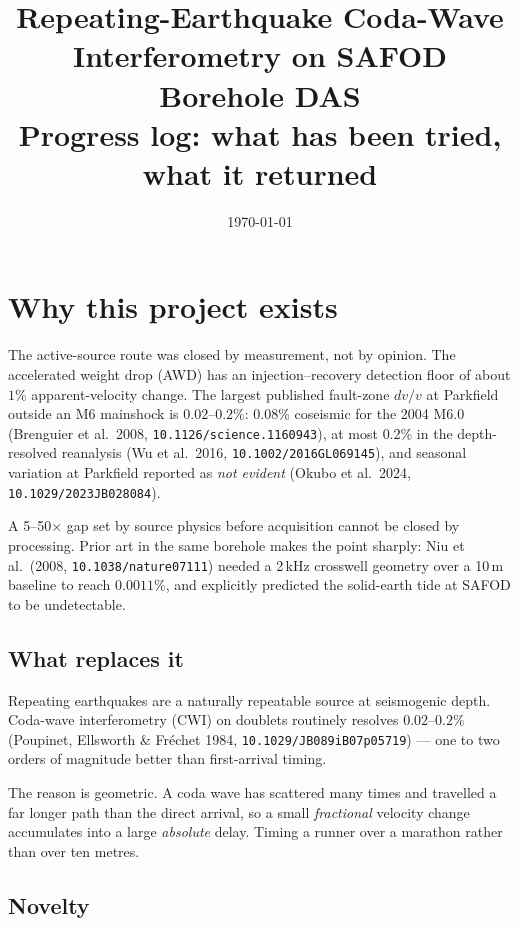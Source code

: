 \documentclass[11pt]{article}
\title{Repeating-Earthquake Coda-Wave Interferometry on SAFOD Borehole DAS\\
\large Progress log: what has been tried, what it returned}
\author{}
\date{\today}
\begin{document}
\maketitle
\tableofcontents
\newpage

\section{Why this project exists}

The active-source route was closed by measurement, not by opinion. The
accelerated weight drop (AWD) has an injection--recovery detection floor of about
$1\%$ apparent-velocity change. The largest published fault-zone $dv/v$ at
Parkfield outside an M6 mainshock is $0.02$--$0.2\%$: $0.08\%$ coseismic for the
2004 M6.0 (Brenguier et al.\ 2008, \texttt{10.1126/science.1160943}), at most
$0.2\%$ in the depth-resolved reanalysis (Wu et al.\ 2016,
\texttt{10.1002/2016GL069145}), and seasonal variation at Parkfield reported as
\emph{not evident} (Okubo et al.\ 2024, \texttt{10.1029/2023JB028084}).

A 5--50$\times$ gap set by source physics before acquisition cannot be closed by
processing. Prior art in the same borehole makes the point sharply: Niu et al.\
(2008, \texttt{10.1038/nature07111}) needed a 2\,kHz crosswell geometry over a
10\,m baseline to reach $0.0011\%$, and explicitly predicted the solid-earth tide
at SAFOD to be undetectable.

\subsection*{What replaces it}

Repeating earthquakes are a naturally repeatable source at seismogenic depth.
Coda-wave interferometry (CWI) on doublets routinely resolves
$\mathbf{0.02}$--$\mathbf{0.2\%}$ (Poupinet, Ellsworth \& Fr\'echet 1984,
\texttt{10.1029/JB089iB07p05719}) --- one to two orders of magnitude better than
first-arrival timing.

The reason is geometric. A coda wave has scattered many times and travelled a far
longer path than the direct arrival, so a small \emph{fractional} velocity change
accumulates into a large \emph{absolute} delay. Timing a runner over a marathon
rather than over ten metres.

\subsection*{Novelty}
\end{document}

